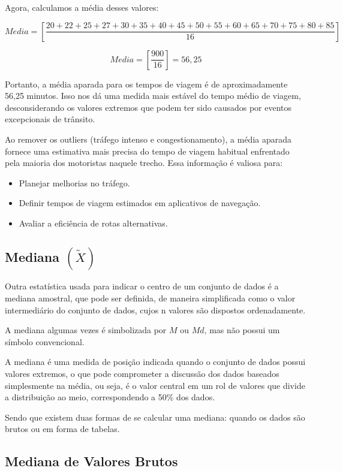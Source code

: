 Agora, calculamos a média desses valores:

$$
Media = \left[\frac{20+22+25+27+30+35+40+45+50+55+60+65+70+75+80+85}{16} \right]
$$

$$
Media =  \left[\frac{900}{16}  \right]= 56,25
$$

Portanto, a média aparada para os tempos de viagem é de aproximadamente 56,25 minutos. Isso nos dá uma medida mais estável do tempo médio de viagem, desconsiderando os valores extremos que podem ter sido causados por eventos excepcionais de trânsito.\vskip0.3cm


Ao remover os outliers (tráfego intenso e congestionamento), a média aparada fornece uma estimativa mais precisa do tempo de viagem habitual enfrentado pela maioria dos motoristas naquele trecho. Essa informação é valiosa para:

\begin{itemize}
    \item Planejar melhorias no tráfego.
    \item Definir tempos de viagem estimados em aplicativos de navegação.
    \item Avaliar a eficiência de rotas alternativas.
\end{itemize}

\subsection{Mediana $(\widetilde{X})$}

Outra estatística usada para indicar o centro de um conjunto de dados é a mediana amostral, que pode ser definida, de maneira simplificada como o valor intermediário do conjunto de dados, cujos n valores são dispostos ordenadamente.\vskip0.3cm

A mediana algumas vezes é simbolizada por $M$ ou $Md$, mas não possui um símbolo convencional.\vskip0.3cm

A mediana é uma medida de posição indicada quando o conjunto de dados possui valores extremos,
o que pode comprometer a discussão dos dados baseados simplesmente na média, ou seja, é o
valor central em um rol de valores que divide a distribuição ao meio, correspondendo a 50\% dos dados.\vskip0.3cm

Sendo que existem duas formas de se calcular uma mediana: quando os dados são brutos ou em forma de tabelas.\vskip0.3cm


\subsection{Mediana de Valores Brutos}


